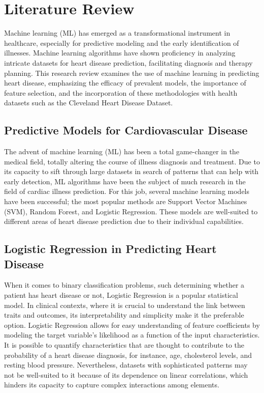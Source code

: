 \section{Literature Review}
Machine learning (ML) has emerged as a transformational instrument in healthcare, especially for predictive modeling and the early identification of illnesses. Machine learning algorithms have shown proficiency in analyzing intricate datasets for heart disease prediction, facilitating diagnosis and therapy planning. This research review examines the use of machine learning in predicting heart disease, emphasizing the efficacy of prevalent models, the importance of feature selection, and the incorporation of these methodologies with health datasets such as the Cleveland Heart Disease Dataset.

\subsection{Predictive Models for Cardiovascular Disease}
The advent of machine learning (ML) has been a total game-changer in the medical field, totally altering the course of illness diagnosis and treatment. Due to its capacity to sift through large datasets in search of patterns that can help with early detection, ML algorithms have been the subject of much research in the field of cardiac illness prediction. For this job, several machine learning models have been successful; the most popular methods are Support Vector Machines (SVM), Random Forest, and Logistic Regression. These models are well-suited to different areas of heart disease prediction due to their individual capabilities.

\subsection{Logistic Regression in Predicting Heart Disease}
When it comes to binary classification problems, such determining whether a patient has heart disease or not, Logistic Regression is a popular statistical model. In clinical contexts, where it is crucial to understand the link between traits and outcomes, its interpretability and simplicity make it the preferable option. Logistic Regression allows for easy understanding of feature coefficients by modeling the target variable's likelihood as a function of the input characteristics. It is possible to quantify characteristics that are thought to contribute to the probability of a heart disease diagnosis, for instance, age, cholesterol levels, and resting blood pressure. Nevertheless, datasets with sophisticated patterns may not be well-suited to it because of its dependence on linear correlations, which hinders its capacity to capture complex interactions among elements.

